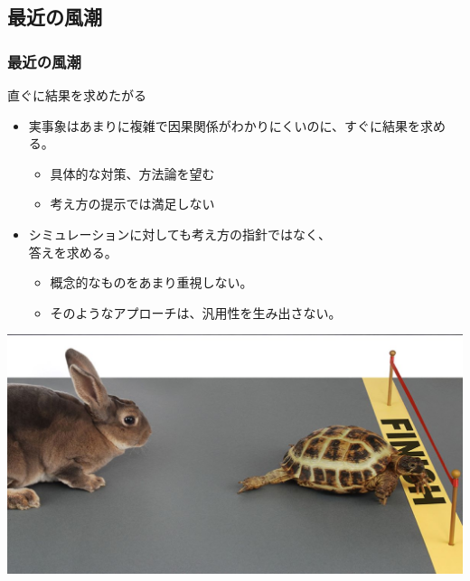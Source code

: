 \documentclass[unicode,12pt]{beamer}%
\begin{document}
\subsection{最近の風潮}
\begin{frame}
    \frametitle{最近の風潮}
            \begin{block}{直ぐに結果を求めたがる}
                \begin{itemize}
                    \item 実事象はあまりに複雑で因果関係がわかりにくいのに、すぐに結果を求める。
                    \begin{itemize}
                        \item 具体的な対策、方法論を望む
                        \item 考え方の提示では満足しない
                    \end{itemize}
                    \item シミュレーションに対しても考え方の指針ではなく、\\答えを求める。
                    \begin{itemize}
                        \item 概念的なものをあまり重視しない。
                        \item そのようなアプローチは、汎用性を生み出さない。
                    \end{itemize}
                \end{itemize}

                    \centering
                        \includegraphics[width=.4\textwidth]{usagi_kame.jpg}
                
            \end{block}
\end{frame}
\end{document}
